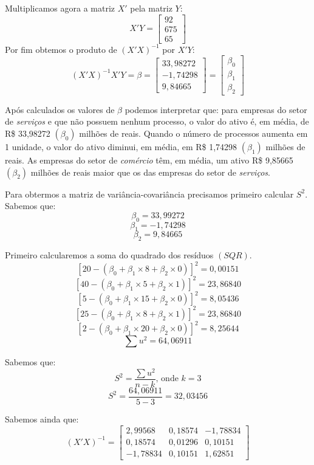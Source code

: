 Multiplicamos agora a matriz \(X'\) pela matriz \(Y\):
\[
    X'Y =
    \begin{bmatrix}
        92 \\
        675 \\
        65
    \end{bmatrix}
\]
 Por fim obtemos o produto de \((X'X)^{-1}\) por \(X'Y\):
 \[
    (X'X)^{-1}X'Y = \beta =
    \begin{bmatrix}
        33,98272 \\
        -1,74298 \\
        9,84665
    \end{bmatrix} =
    \begin{bmatrix}
        \beta_{0} \\
        \beta_{1} \\
        \beta_{2}
    \end{bmatrix}
 \]

Após calculados os valores de \(\beta\) podemos interpretar que: para empresas do setor de \textit{serviços} e que não possuem nenhum processo, o valor do ativo é, em média, de R\$ 33,98272 \((\beta_{0})\) milhões de reais. Quando o número de processos aumenta em 1 unidade, o valor do ativo diminui, em média, em R\$ 1,74298 \((\beta_{1})\) milhões de reais. As empresas do setor de \textit{comércio} têm, em média, um ativo R\$ 9,85665 \((\beta_{2})\) milhões de reais maior que os das empresas do setor de \textit{serviços}.

Para obtermos a matriz de variância-covariância precisamos primeiro calcular \(S^{2}\). Sabemos que:
\[ \beta_{0} = 33,99272 \]
\[ \beta_{1} = -1,74298 \]
\[ \beta_{2} = 9,84665 \]

Primeiro calcularemos a soma do quadrado dos resíduos \((SQR)\).
\[ [ 20 - (\beta_{0} + \beta_{1} \times 8 + \beta_{2} \times 0)]^2 = 0,00151\]
\[ [ 40 - (\beta_{0} + \beta_{1} \times 5 + \beta_{2} \times 1)]^2 = 23,86840\]
\[ [ 5 - (\beta_{0} + \beta_{1} \times 15 + \beta_{2} \times 0)]^2 = 8,05436\]
\[ [ 25 - (\beta_{0} + \beta_{1} \times 8 + \beta_{2} \times 1)]^2 = 23,86840\]
\[ [ 2 - (\beta_{0} + \beta_{1} \times 20 + \beta_{2} \times 0)]^2 = 8,25644\]
\[ \sum u^{2} = 64,06911\]

Sabemos que:
\[ S^{2} = \frac{\sum u^{2}}{n-k}\textrm{, onde }k = 3\]
\[S^{2} = \frac{64,06911}{5 - 3} = 32,03456\]

Sabemos ainda que:
\[
    (X'X)^{-1} =
    \begin{bmatrix}
        2,99568 & 0,18574 & -1,78834 \\
        0,18574 & 0,01296 & 0,10151 \\
        -1,78834 & 0,10151 & 1,62851
    \end{bmatrix}
\]


